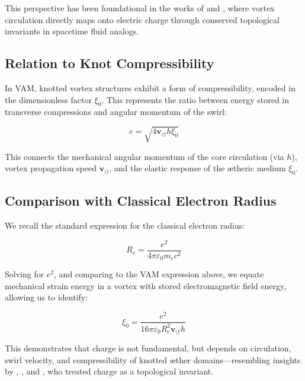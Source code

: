 \documentclass[12pt]{article}
\begin{document}
This perspective has been foundational in the works of \cite{kiehn2005topological} and \cite{sbitnev2015hydro2}, where vortex circulation directly maps onto electric charge through conserved topological invariants in spacetime fluid analogs.

\subsection*{Relation to Knot Compressibility}

In VAM, knotted vortex structures exhibit a form of compressibility, encoded in the dimensionless factor \( \xi_0 \). This represents the ratio between energy stored in transverse compressions and angular momentum of the swirl:

\begin{equation}
    e = \sqrt{4 \mathbf{v}_{\scriptscriptstyle\boldsymbol{\circlearrowleft}} h \xi_0}
\end{equation}

This connects the mechanical angular momentum of the core circulation (via \( h \)), vortex propagation speed \( \mathbf{v}_{\scriptscriptstyle\boldsymbol{\circlearrowleft}} \), and the elastic response of the ætheric medium \( \xi_0 \).

\subsection*{Comparison with Classical Electron Radius}

We recall the standard expression for the classical electron radius:

\begin{equation}
    R_e = \frac{e^2}{4\pi \varepsilon_0 m_e c^2}
\end{equation}

Solving for \( e^2 \), and comparing to the VAM expression above, we equate mechanical strain energy in a vortex with stored electromagnetic field energy, allowing us to identify:

\begin{equation}
    \xi_0 = \frac{e^2}{16\pi \varepsilon_0 R_e^2 \mathbf{v}_{\scriptscriptstyle\boldsymbol{\circlearrowleft}} h}
\end{equation}

This demonstrates that charge is not fundamental, but depends on circulation, swirl velocity, and compressibility of knotted æther domains—resembling insights by \cite{ranada1989topological}, \cite{bowick1994charge}, and \cite{sidharth2006vortex}, who treated charge as a topological invariant.
\end{document}
